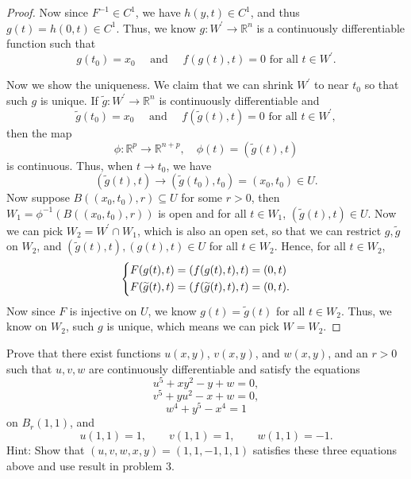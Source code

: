 \begin{proof}
    Now since \(F^{-1} \in C^1\), we have \(h(y, t) \in C^1\), and thus \(g(t) = h(0, t) \in C^1\). Thus, we know \(g: W^{\prime} \to \mathbb{R} ^n\) is a continuously differentiable function such that 
    \[
        g(t_0) = x_0 \quad \text{ and } \quad f(g(t), t) = 0 \text{ for all } t \in W^{\prime}.  
    \]    

    Now we show the uniqueness. We claim that we can shrink \(W^{\prime}\) to near \(t_0\) so that such \(g\) is unique. If \(\widetilde{g}: W^{\prime}  \to \mathbb{R} ^n\) is continuously differentiable and 
    \[
        \widetilde{g} (t_0) = x_0 \quad \text{ and } \quad f(\widetilde{g} (t), t) = 0 \text{ for all } t \in W^{\prime} ,  
    \]
    then the map
    \[
        \phi : \mathbb{R} ^p \to \mathbb{R} ^{n + p}, \quad \phi (t) = (\widetilde{g} (t), t)
    \]
    is continuous. Thus, when \(t \to t_0\), we have 
    \[
        (\widetilde{g} (t), t) \to (\widetilde{g} (t_0), t_0) = (x_0, t_0) \in U.
    \] 
    Now suppose \(B((x_0, t_0), r) \subseteq U\) for some \(r > 0\), then \(W_1 = \phi ^{-1}(B((x_0, t_0), r))\) is open and for all \(t \in W_1\), \((\widetilde{g} (t), t) \in U\). Now we can pick \(W_2 = W^{\prime} \cap W_1\), which is also an open set, so that we can restrict \(g, \widetilde{g} \) on \(W_2\), and \((\widetilde{g} (t), t), (g(t), t) \in U\) for all \(t \in W_2\). Hence, for all \(t \in W_2\), 
    \[
        \begin{dcases}
            F(g(t), t) = (f(g(t), t), t) = (0, t) \\
            F(\widetilde{g} (t), t) = (f (\widetilde{g} (t), t), t) = (0, t).
        \end{dcases}
    \]
    Now since \(F\) is injective on \(U\), we know \(g(t) = \widetilde{g} (t)\) for all \(t \in W_2\). Thus, we know on \(W_2\), such \(g\) is unique, which means we can pick \(W = W_2\).       
\end{proof}

\begin{problem}

Prove that there exist functions \(u(x,y)\), \(v(x,y)\), and \(w(x,y)\), and an
\(r>0\) such that \(u,v,w\) are continuously differentiable and satisfy the
equations
\[
u^5+xy^2-y+w=0,
\]
\[
v^5+yu^2-x+w=0,
\]
\[
w^4+y^5-x^4=1
\]
on \(B_r(1,1)\), and
\[
u(1,1)=1,\qquad v(1,1)=1,\qquad w(1,1)=-1.
\] Hint: Show that $(u,v,w,x,y)= (1,1,-1,1,1)$ satisfies these three equations above and use result in problem 3. 

\end{problem}


